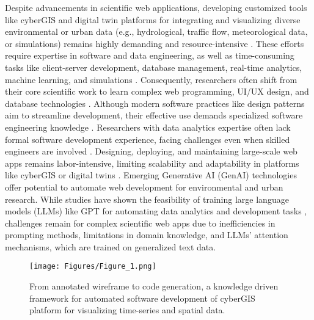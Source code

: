 Despite advancements in scientific web applications, developing customized tools like cyberGIS and digital twin platforms for integrating and visualizing diverse environmental or urban data (e.g., hydrological, traffic flow, meteorological data, or simulations) remains highly demanding and resource-intensive \citep{shanjun2024design, siddiqui2024digital, lei2023challenges}. These efforts require expertise in software and data engineering, as well as time-consuming tasks like client-server development, database management, real-time analytics, machine learning, and simulations \citep{ikegwu2022big}. Consequently, researchers often shift from their core scientific work to learn complex web programming, UI/UX design, and database technologies \citep{li2022bibliometric}. Although modern software practices like design patterns aim to streamline development, their effective use demands specialized software engineering knowledge \citep{fayad2015software}. Researchers with data analytics expertise often lack formal software development experience, facing challenges even when skilled engineers are involved \citep{kim2017data}. Designing, deploying, and maintaining large-scale web apps remains labor-intensive, limiting scalability and adaptability in platforms like cyberGIS or digital twins \citep{shah2024optimizing, mcbreen2002software, liu2015cybergis}. Emerging Generative AI (GenAI) technologies offer potential to automate web development for environmental and urban research. While studies have shown the feasibility of training large language models (LLMs) like GPT for automating data analytics and development tasks \citep{liang2024can, liukko2024chatgpt}, challenges remain for complex scientific web apps due to inefficiencies in prompting methods, limitations in domain knowledge, and LLMs' attention mechanisms, which are trained on generalized text data.

\begin{figure*}[htb]
 \centering
\texttt{[image: Figures/Figure\_1.png]}
 \caption{From annotated wireframe to code generation, a knowledge driven framework for automated software development of cyberGIS platform for visualizing time-series and spatial data. }
 \label{fig:concepts}
\end{figure*}

